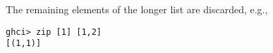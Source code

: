 
The remaining elements of the longer list are discarded, e.g., 
\scriptsize\begin{verbatim}
ghci> zip [1] [1,2]
[(1,1)]
\end{verbatim}\normalsize
